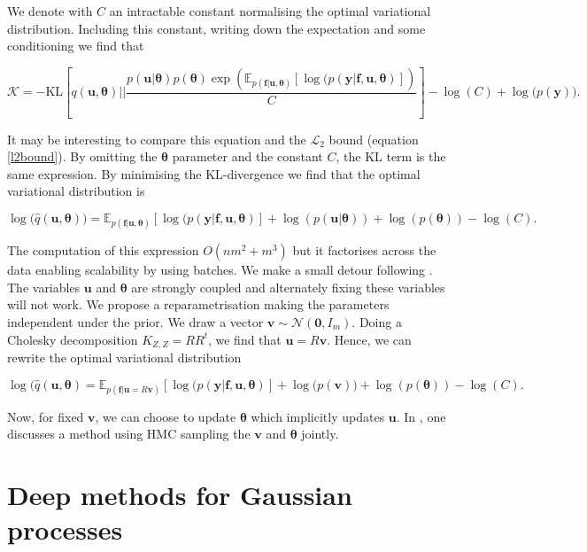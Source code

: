 \documentclass[12pt,a4paper,oneside]{book}
\begin{document}
We denote with $C$ an intractable constant normalising the optimal variational distribution. Including this constant, writing down the expectation and some conditioning we find that 

\begin{equation}
\mathcal{K} = - \text{KL} \left[ q(\bm{u}, \bm{\theta}) || \dfrac{p(\bm{u}|\bm{\theta}) p(\bm{\theta}) \exp \left( \mathbb{E}_{p(\bm{f}|\bm{u}, \bm{\theta})} [\log{(p(\bm{y}|\bm{f},\bm{u}, \bm{\theta})}] \right) }{C} \right] - \log{(C)} + \log{(p(\bm{y})}). 
\end{equation}

It may be interesting to compare this equation and the $\mathcal{L}_2$ bound (equation \ref{l2bound}). By omitting the $\bm{\theta}$ parameter and the constant $C$, the KL term is the same expression.  By minimising the KL-divergence we find that the optimal variational distribution is

\begin{equation}
\log{( \hat{q}(\bm{u},\bm{\theta})}) =  \mathbb{E}_{p(\bm{f}|\bm{u}, \bm{\theta})} [\log{(p(\bm{y}|\bm{f}, \bm{u}, \bm{\theta})}] + \log{(p(\bm{u}|\bm{\theta}))} + \log{(p(\bm{\theta}))} - \log{(C)}. 
\end{equation}

The computation of this expression $O(nm^2 +m^3)$ but it factorises across the data enabling scalability by using batches. We make a small detour following \cite{murray2010slice}. The variables $\bm{u}$ and $\bm{\theta}$ are strongly coupled and alternately fixing these variables will not work. We propose a reparametrisation making the parameters independent under the prior.  We draw a vector $\bm{v} \sim \mathcal{N}(\bm{0}, I_m)$. Doing a Cholesky decomposition $K_{Z,Z} = RR^t$, we find that $\bm{u} = R \bm{v}$. Hence, we can rewrite the optimal variational distribution 

\begin{equation}
\log{( \hat{q}(\bm{u},\bm{\theta})} =  \mathbb{E}_{p(\bm{f}|\bm{u} = R \bm{v})} [\log{(p(\bm{y}|\bm{f},\bm{u}, \bm{\theta})}] + \log{(p(\bm{v})}) + \log{(p(\bm{\theta}))} - \log{(C)}. 
\end{equation}

Now, for fixed $\bm{v}$, we can choose to update $\bm{\theta}$ which implicitly updates $\bm{u}$. In \cite{hensman2015mcmc}, one discusses a method using HMC sampling the $\bm{v}$ and $\bm{\theta}$ jointly. 

\section{Deep methods for Gaussian processes}
\end{document}
